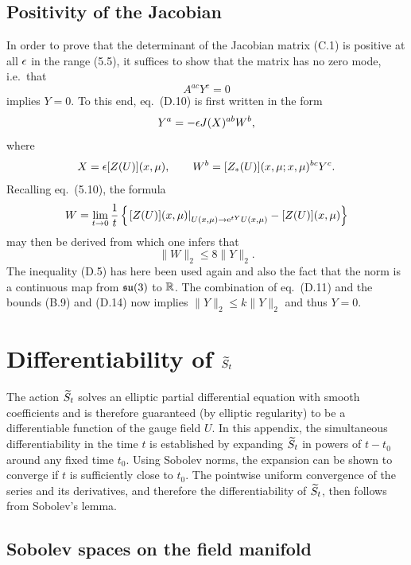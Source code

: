 \subsection{Positivity of the Jacobian}

In order to prove that
the determinant of the Jacobian matrix (C.1) is positive
at all $\epsilon$ in the range (5.5),
it suffices to show that the matrix has no zero mode, i.e.\ that
\begin{equation}
  A^{ac}Y^c=0
\end{equation}
implies $Y=0$.
To this end, eq.~(D.10) is first written in the form
\begin{equation}
  Y^a=-\epsilon J(X)^{ab}W^b,
\end{equation}
where
\begin{equation}
  X=\epsilon[Z(U)](x,\mu),\qquad
  W^b=[Z_{*}(U)](x,\mu;x,\mu)^{bc}Y^c.
\end{equation}
Recalling eq.~(5.10), the formula
\begin{equation}
  W=\lim_{t\to0}{1\over t}\left\{
  \left.[Z(U)](x,\mu)\right|_{U(x,\mu)\to\mathrm{e}^{tY}U(x,\mu)}-[Z(U)](x,\mu)
  \right\}
\end{equation}
may then be derived from which one infers that
\begin{equation}
  \|W\|_2\leq 8\|Y\|_2.
\end{equation}
The inequality (D.5) has here been used again and also the fact that
the norm is a continuous map from $\mathfrak{su}(3)$ to $\mathbb{R}$.
The combination of eq.~(D.11) and the bounds (B.9) and (D.14)
now implies $\|Y\|_2\leq k\|Y\|_2$ and thus $Y=0$.

\section{Differentiability of $\widetilde{S}_t$}

The action $\widetilde{S}_t$ solves an
elliptic partial differential equation with smooth coefficients
and is therefore guaranteed (by elliptic regularity)
to be a differentiable function of the
gauge field $U$.
In this appendix, the simultaneous
differentiability in the time $t$
is established by expanding $\widetilde{S}_t$
in powers of $t-t_0$ around any fixed time $t_0$.
Using Sobolev norms,
the expansion can be shown to converge
if $t$ is sufficiently close to $t_0$.
The pointwise
uniform convergence of the series and its derivatives,
and therefore the differentiability of $\widetilde{S}_t$,
then follows from
Sobolev's lemma.


\subsection{Sobolev spaces on the field manifold}

